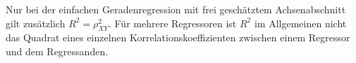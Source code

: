 Nur bei der einfachen Geradenregression mit frei
geschätztem Achsenabschnitt gilt zusätzlich
$R^2=\rho_{XY}^2$. Für mehrere Regressoren ist $R^2$
im Allgemeinen nicht das Quadrat eines einzelnen
Korrelationskoeffizienten zwischen einem Regressor
und dem Regressanden.


